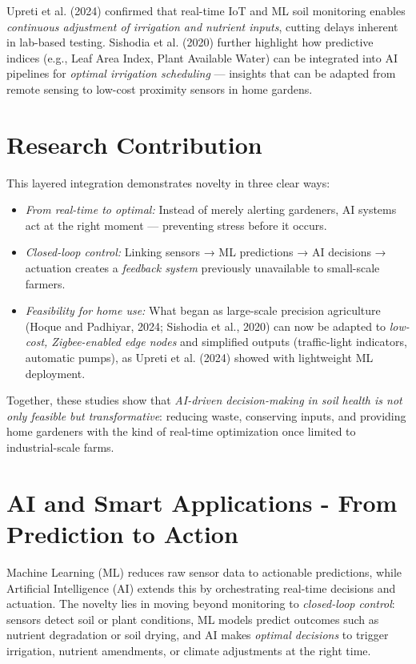 \documentclass{sigchi}
\begin{document}
Upreti et al. (2024) confirmed that real-time IoT and ML soil monitoring enables \emph{continuous adjustment of irrigation and nutrient inputs}, cutting delays inherent in lab-based testing.
Sishodia et al. (2020) further highlight how predictive indices (e.g., Leaf Area Index, Plant Available Water) can be integrated into AI pipelines for \emph{optimal irrigation scheduling} — insights that can be adapted from remote sensing to low-cost proximity sensors in home gardens.

\section{Research Contribution}

This layered integration demonstrates novelty in three clear ways:
\begin{itemize}
\item \emph{From real-time to optimal:} Instead of merely alerting gardeners, AI systems act at the right moment — preventing stress before it occurs.
\item \emph{Closed-loop control:} Linking sensors → ML predictions → AI decisions → actuation creates a \emph{feedback system} previously unavailable to small-scale farmers.
\item \emph{Feasibility for home use:} What began as large-scale precision agriculture (Hoque and Padhiyar, 2024; Sishodia et al., 2020) can now be adapted to \emph{low-cost, Zigbee-enabled edge nodes} and simplified outputs (traffic-light indicators, automatic pumps), as Upreti et al. (2024) showed with lightweight ML deployment.
\end{itemize}
Together, these studies show that \emph{AI-driven decision-making in soil health is not only feasible but transformative}: reducing waste, conserving inputs, and providing home gardeners with the kind of real-time optimization once limited to industrial-scale farms.

\section{AI and Smart Applications - From Prediction to Action}

Machine Learning (ML) reduces raw sensor data to actionable predictions, while Artificial Intelligence (AI) extends this by orchestrating real-time decisions and actuation.
The novelty lies in moving beyond monitoring to \emph{closed-loop control}: sensors detect soil or plant conditions, ML models predict outcomes such as nutrient degradation or soil drying, and AI makes \emph{optimal decisions} to trigger irrigation, nutrient amendments, or climate adjustments at the right time.
\end{document}
